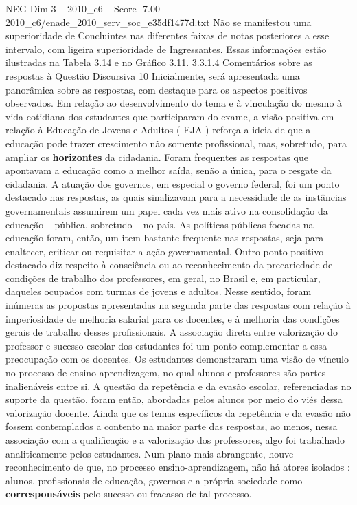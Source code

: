 \begin{textsample}{NEG Dim 3 – 2010\_c6 – Score -7.00 – 2010\_c6/enade\_2010\_serv\_soc\_e35df1477d.txt}
Não se manifestou uma superioridade de Concluintes nas diferentes faixas de notas posteriores a esse intervalo, com ligeira superioridade de Ingressantes.
Essas informações estão ilustradas na Tabela 3.14 e no Gráfico 3.11. 3.3.1.4 Comentários sobre as respostas à Questão Discursiva 10 Inicialmente, será apresentada uma panorâmica sobre as respostas, com destaque para os aspectos positivos observados.
Em relação ao desenvolvimento do tema e à vinculação do mesmo à vida cotidiana dos estudantes que participaram do exame, a visão positiva em relação à Educação de Jovens e Adultos ( EJA ) reforça a ideia de que a educação pode trazer crescimento não somente profissional, mas, sobretudo, para ampliar os \textbf{horizontes} da cidadania.
Foram frequentes as respostas que apontavam a educação como a melhor saída, senão a única, para o resgate da cidadania.
A atuação dos governos, em especial o governo federal, foi um ponto destacado nas respostas, as quais sinalizavam para a necessidade de as instâncias governamentais assumirem um papel cada vez mais ativo na consolidação da educação – pública, sobretudo – no país.
As políticas públicas focadas na educação foram, então, um item bastante frequente nas respostas, seja para enaltecer, criticar ou requisitar a ação governamental.
Outro ponto positivo destacado diz respeito à consciência ou ao reconhecimento da precariedade de condições de trabalho dos professores, em geral, no Brasil e, em particular, daqueles ocupados com turmas de jovens e adultos.
Nesse sentido, foram inúmeras as propostas apresentadas na segunda parte das respostas com relação à imperiosidade de melhoria salarial para os docentes, e à melhoria das condições gerais de trabalho desses profissionais.
A associação direta entre valorização do professor e sucesso escolar dos estudantes foi um ponto complementar a essa preocupação com os docentes.
Os estudantes demonstraram uma visão de vínculo no processo de ensino-aprendizagem, no qual alunos e professores são partes inalienáveis entre si.
A questão da repetência e da evasão escolar, referenciadas no suporte da questão, foram então, abordadas pelos alunos por meio do viés dessa valorização docente.
Ainda que os temas específicos da repetência e da evasão não fossem contemplados a contento na maior parte das respostas, ao menos, nessa associação com a qualificação e a valorização dos professores, algo foi trabalhado analiticamente pelos estudantes.
Num plano mais abrangente, houve reconhecimento de que, no processo ensino-aprendizagem, não há atores isolados : alunos, profissionais de educação, governos e a própria sociedade como \textbf{corresponsáveis} pelo sucesso ou fracasso de tal processo.

\end{textsample}

